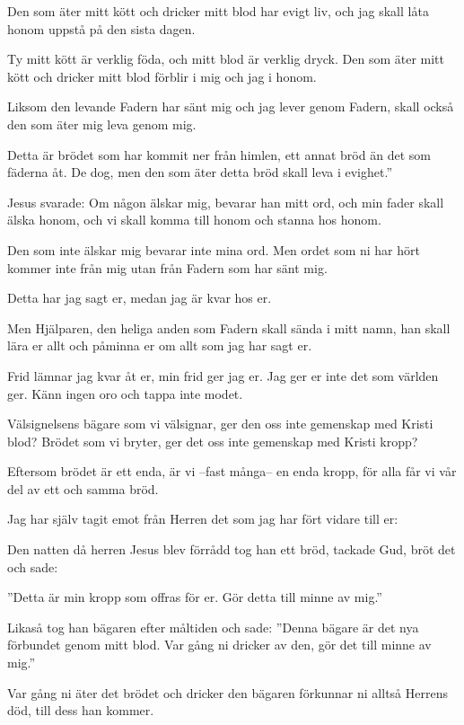 Den som äter mitt kött och dricker mitt blod har evigt liv, och jag skall låta honom uppstå på den sista dagen.

Ty mitt kött är verklig föda, och mitt blod är verklig dryck.
Den som äter mitt kött och dricker mitt blod förblir i mig och jag i honom.

Liksom den levande Fadern har sänt mig och jag lever genom Fadern, skall också den som äter mig leva genom mig.

Detta är brödet som har kommit ner från himlen, ett annat bröd än det som fäderna åt. De dog, men den som äter detta bröd skall leva i evighet.''



{Jesus svarade: Om någon älskar mig, bevarar han mitt ord, och min fader skall älska honom, och vi skall komma till honom och stanna hos honom.}

Den som inte älskar mig bevarar inte mina ord. Men ordet som ni har hört kommer inte från mig utan från Fadern som har sänt mig.

Detta har jag sagt er, medan jag är kvar hos er.

Men Hjälparen, den heliga anden som Fadern skall sända i mitt namn, han skall lära er allt och påminna er om allt som jag har sagt er.

Frid lämnar jag kvar åt er, min frid ger jag er. Jag ger er inte det som världen ger. Känn ingen oro och tappa inte modet.

{Välsignelsens bägare som vi välsignar, ger den oss inte gemenskap med Kristi blod?} Brödet som vi bryter, ger det oss inte gemenskap med Kristi kropp?

Eftersom brödet är ett enda, är vi --fast många-- en enda kropp, för alla får vi vår del av ett och samma bröd.

{Jag har själv tagit emot från Herren det som jag har fört vidare till er:} 

Den natten då herren Jesus blev förrådd tog han ett bröd,
tackade Gud, bröt det och sade: 

''Detta är min kropp som offras för er. Gör detta till minne av mig.''

Likaså tog han bägaren efter måltiden och sade: ''Denna bägare är det nya förbundet genom mitt blod. Var gång ni dricker av den, gör det till minne av mig.''

Var gång ni äter det brödet och dricker den bägaren förkunnar ni alltså Herrens död, till dess han kommer.



